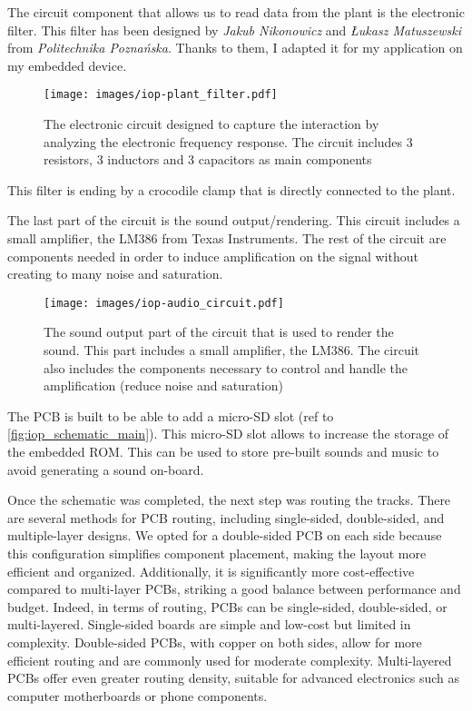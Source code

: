 The circuit component that allows us to read data from the plant is the electronic filter.
This filter has been designed by \textit{Jakub Nikonowicz} and \textit{Łukasz Matuszewski}
from \textit{Politechnika Poznańska}.
Thanks to them, I adapted it for my application on my embedded device.

\begin{figure}[H]
    \centering
    \texttt{[image: images/iop-plant\_filter.pdf]}
    \caption{The electronic circuit designed to capture the interaction by analyzing the electronic
        frequency response. The circuit includes 3 resistors, 3 inductors and 3 capacitors as main components}
    \vspace{0.1cm}
    \label{fig:iop_schematic_filter}
\end{figure}

This filter is ending by a crocodile clamp that is directly connected to the plant.

The last part of the circuit is the sound output/rendering. This circuit includes a small amplifier,
the LM386 from Texas Instruments. The rest of the circuit are components needed in order to
induce amplification on the signal without creating to many noise and saturation.

\begin{figure}[H]
    \centering
    \texttt{[image: images/iop-audio\_circuit.pdf]}
    \caption{The sound output part of the circuit that is used to render the sound.
        This part includes a small amplifier, the LM386. The circuit also includes the components necessary
        to control and handle the amplification (reduce noise and saturation)}
    \vspace{0.1cm}
    \label{fig:iop_schematic_audio}
\end{figure}

The PCB is built to be able to add a micro-SD slot (ref to \ref{fig:iop_schematic_main}). This micro-SD slot
allows to increase the storage of the embedded ROM. This can be used to store pre-built sounds and music to avoid generating a sound on-board.


Once the schematic was completed, the next step was routing the tracks. There are several methods for PCB routing, including single-sided, double-sided, and multiple-layer designs. We opted for a double-sided PCB on each side because this configuration simplifies component placement, making the layout more efficient and organized. Additionally, it is significantly more cost-effective compared to multi-layer PCBs, striking a good balance between performance and budget. Indeed, in terms of routing, PCBs can be single-sided, double-sided, or multi-layered. Single-sided boards are simple and low-cost but limited in complexity. Double-sided PCBs, with copper on both sides, allow for more efficient routing and are commonly used for moderate complexity. Multi-layered PCBs offer even greater routing density, suitable for advanced electronics such as computer motherboards or phone components.

